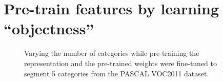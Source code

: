 \section{Pre-train features by learning ``objectness''}
\label{sec:objectness}

\begin{table}[t]
\caption{Performances of FCN with Alexnet trained to segment 5 categories from the PASCAL VOC2011 dataset with different representation initializations.
\textit{CompleteCategory} is the model pre-trained to segment the other 15 categories from the PASCAL VOC2011 dataset; The \textit{PixelObjectness} model was pre-trained to distinguish the instance against the background; The \textit{RandomCategory} model was pre-trained with instances assigned random categories from the other 15 categories.}
\label{tab:objectness}
\end{table}


\begin{figure}[t]
\centering
\fbox{\rule{0pt}{2in} \rule{0.9\linewidth}{0pt}}
\caption{Varying the number of categories while pre-training the representation and the pre-trained weights were fine-tuned to segment 5 categories from the PASCAL VOC2011 dataset.}
\label{fig:categories}
\end{figure}
